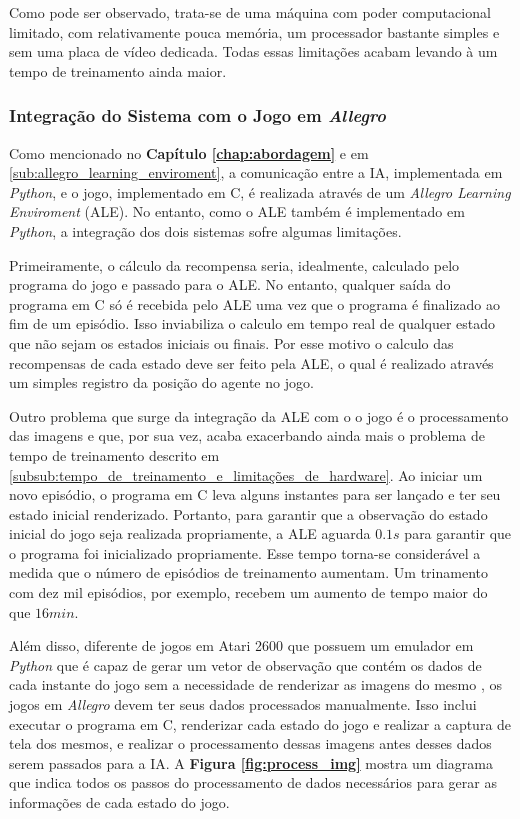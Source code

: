 Como pode ser observado, trata-se de uma máquina com poder computacional limitado, com relativamente pouca memória, um processador bastante simples e sem uma placa de vídeo dedicada. Todas essas limitações acabam levando à um tempo de treinamento ainda maior.


\subsubsection{Integração do Sistema com o Jogo em \textit{Allegro}} %
\label{subsub:integração_do_sistema_com_o_jogo}

Como mencionado no \textbf{Capítulo \ref{chap:abordagem}} e em \ref{sub:allegro_learning_enviroment}, a comunicação entre a IA, implementada em \textit{Python}, e o jogo, implementado em C, é realizada através de um \textit{Allegro Learning Enviroment} (ALE). No entanto, como o ALE também é implementado em \textit{Python}, a integração dos dois sistemas sofre algumas limitações.

Primeiramente, o cálculo da recompensa seria, idealmente, calculado pelo programa do jogo e passado para o ALE. No entanto, qualquer saída do programa em C só é recebida pelo ALE uma vez que o programa é finalizado ao fim de um episódio. Isso inviabiliza o calculo em tempo real de qualquer estado que não sejam os estados iniciais ou finais. Por esse motivo o calculo das recompensas de cada estado deve ser feito pela ALE, o qual é realizado através um simples registro da posição do agente no jogo.

Outro problema que surge da integração da ALE com o o jogo é o processamento das imagens e que, por sua vez, acaba exacerbando ainda mais o problema de tempo de treinamento descrito em \ref{subsub:tempo_de_treinamento_e_limitações_de_hardware}. Ao iniciar um novo episódio, o programa em C leva alguns instantes para ser lançado e ter seu estado inicial renderizado. Portanto, para garantir que a observação do estado inicial do jogo seja realizada propriamente, a ALE aguarda $0.1s$ para garantir que o programa foi inicializado propriamente. Esse tempo torna-se considerável a medida que o número de episódios de treinamento aumentam. Um trinamento com dez mil episódios, por exemplo, recebem um aumento de tempo maior do que $16min$. 

Além disso, diferente de jogos em Atari 2600 que possuem um emulador em \textit{Python} que é capaz de gerar um vetor de observação que contém os dados de cada instante do jogo sem a necessidade de renderizar as imagens do mesmo \cite{brockman2016openai}, os jogos em \textit{Allegro} devem ter seus dados processados manualmente. Isso inclui executar o programa em C, renderizar cada estado do jogo e realizar a captura de tela dos mesmos, e realizar o processamento dessas imagens antes desses dados serem passados para a IA. A \textbf{Figura \ref{fig:process_img}} mostra um diagrama que indica todos os passos do processamento de dados necessários para gerar as informações de cada estado do jogo.

